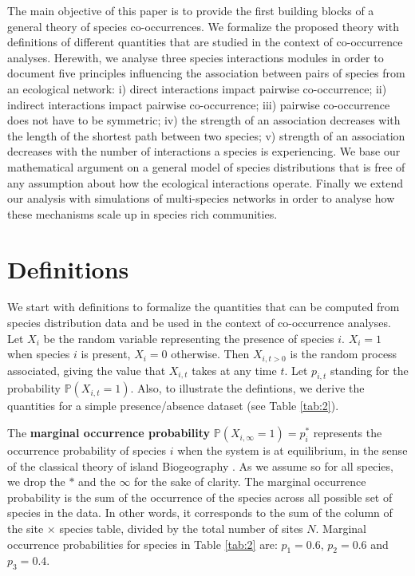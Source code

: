 The main objective of this paper is to provide the first building blocks of a general theory of species co-occurrences. We formalize the proposed theory with definitions of different quantities that are studied in the context of co-occurrence analyses. Herewith, we analyse three species interactions modules in order to document five principles influencing the association between pairs of species from an ecological network:
i) direct interactions impact pairwise co-occurrence;
ii) indirect interactions impact pairwise co-occurrence;
iii) pairwise co-occurrence does not have to be symmetric;
iv) the strength of an association decreases with the length of the shortest path between two species;
v) strength of an association decreases with the number of interactions a species is experiencing.
We base our mathematical argument on a general model of species distributions that is free of
any assumption about how the ecological interactions operate. Finally we
extend our analysis with simulations of multi-species networks in order to
analyse how these mechanisms scale up in species rich communities.



\section{Definitions}
\label{def}


We start with definitions to formalize the quantities that can be computed
from species distribution data and be used in the context of co-occurrence
analyses. Let $X_i$ be the random variable representing the presence of species
$i$. $X_i=1$ when species $i$ is present, $X_i=0$ otherwise. Then $X_{i,t>0}$ is
the random process associated, giving the value that $X_{i,t}$ takes at any time
$t$. Let $p_{i,t}$ standing for the probability $\mathbb{P}(X_{i,t}=1)$. Also, to illustrate the defintions, we derive the quantities for a simple presence/absence dataset (see Table \ref{tab:2}).

The \textbf{marginal occurrence probability} $\mathbb{P}(X_{i,\infty}=1)=p_i^*$
represents the occurrence probability of species $i$ when the system is at
equilibrium, in the sense of the classical theory of island Biogeography \cite{MacArthur1967}. As we assume so for all species, we drop the $*$ and the $\infty$ for the sake of clarity. The marginal occurrence probability is the sum of the occurrence of the species across all possible set of species in the data. In other words, it corresponds to the sum of the column of the site $\times$ species table, divided by the total number of sites
$N$. Marginal occurrence probabilities for species in Table \ref{tab:2} are: $p_1=0.6$, $p_2=0.6$ and $p_3=0.4$.

